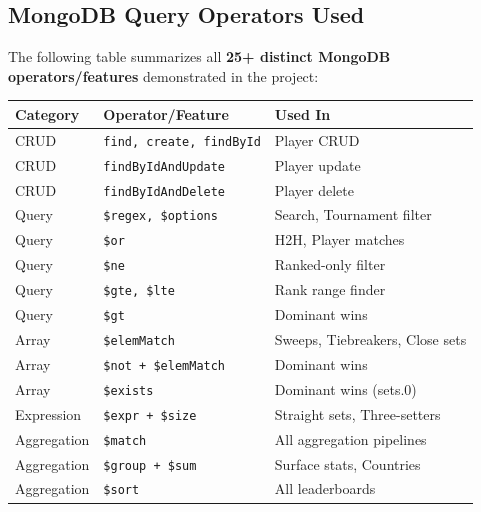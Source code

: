 \documentclass[12pt,a4paper]{article}
\begin{document}
\subsection{MongoDB Query Operators Used}

The following table summarizes all \textbf{25+ distinct MongoDB operators/features} demonstrated in the project:

\begin{longtable}{|l|l|p{5cm}|}
    \hline
    \textbf{Category} & \textbf{Operator/Feature} & \textbf{Used In} \\
    \hline
    \endhead
    CRUD        & \texttt{find, create, findById}         & Player CRUD \\
    \hline
    CRUD        & \texttt{findByIdAndUpdate}               & Player update \\
    \hline
    CRUD        & \texttt{findByIdAndDelete}               & Player delete \\
    \hline
    Query       & \texttt{\$regex, \$options}               & Search, Tournament filter \\
    \hline
    Query       & \texttt{\$or}                             & H2H, Player matches \\
    \hline
    Query       & \texttt{\$ne}                             & Ranked-only filter \\
    \hline
    Query       & \texttt{\$gte, \$lte}                     & Rank range finder \\
    \hline
    Query       & \texttt{\$gt}                             & Dominant wins \\
    \hline
    Array       & \texttt{\$elemMatch}                     & Sweeps, Tiebreakers, Close sets \\
    \hline
    Array       & \texttt{\$not + \$elemMatch}             & Dominant wins \\
    \hline
    Array       & \texttt{\$exists}                         & Dominant wins (sets.0) \\
    \hline
    Expression  & \texttt{\$expr + \$size}                 & Straight sets, Three-setters \\
    \hline
    Aggregation & \texttt{\$match}                         & All aggregation pipelines \\
    \hline
    Aggregation & \texttt{\$group + \$sum}                 & Surface stats, Countries \\
    \hline
    Aggregation & \texttt{\$sort}                          & All leaderboards \\

\end{longtable}
\end{document}
